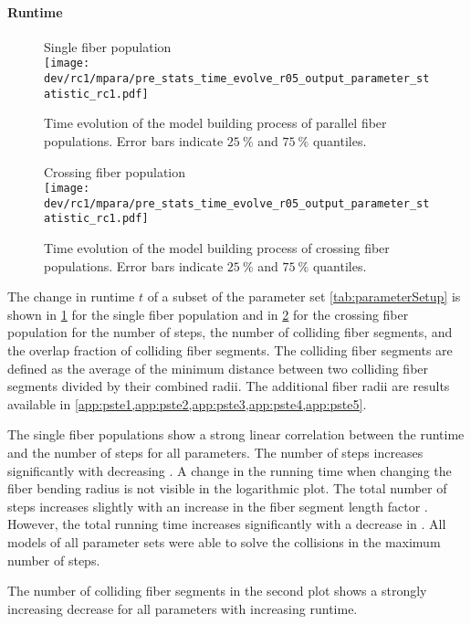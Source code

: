 \paragraph{Runtime}
%
\begin{figure}[p]
\centering
Single fiber population\\[0em]
\texttt{[image: dev/rc1/mpara/pre\_stats\_time\_evolve\_r05\_output\_parameter\_statistic\_rc1.pdf]}
\caption{Time evolution of the model building process of parallel fiber populations. Error bars indicate $\SI{25}{\percent}$ and $\SI{75}{\percent}$ quantiles.}
\label{fig:timeDevelopmentNone}
\end{figure}
%
\begin{figure}[p]
\centering
Crossing fiber population\\[0ex]
\texttt{[image: dev/rc1/mpara/pre\_stats\_time\_evolve\_r05\_output\_parameter\_statistic\_rc1.pdf]}
\caption{Time evolution of the model building process of crossing fiber populations. Error bars indicate $\SI{25}{\percent}$ and $\SI{75}{\percent}$ quantiles.}
\label{fig:timeDevelopmentCross}
\end{figure}
%
The change in runtime $t$ of a subset of the parameter set \cref{tab:parameterSetup} is shown in \cref{fig:timeDevelopmentNone} for the single fiber population and in \cref{fig:timeDevelopmentCross} for the crossing fiber population for the number of steps, the number of colliding fiber segments, and the overlap fraction of colliding fiber segments.
The colliding fiber segments are defined as the average of the minimum distance between two colliding fiber segments divided by their combined radii.
The additional fiber radii are results available in \cref{app:pste1,app:pste2,app:pste3,app:pste4,app:pste5}.
\par
%
The single fiber populations show a strong linear correlation between the runtime and the number of steps for all parameters.
The number of steps increases significantly with decreasing \segLengthFactor{}.
A change in the running time when changing the fiber bending radius \segRadiusFactor{} is not visible in the logarithmic plot.
The total number of steps increases slightly with an increase in the fiber segment length factor \segLengthFactor{}.
However, the total running time increases significantly with a decrease in \segLengthFactor{}.
All models of all parameter sets were able to solve the collisions in the maximum number of steps.
\par
%
The number of colliding fiber segments in the second plot shows a strongly increasing decrease for all parameters with increasing runtime.
